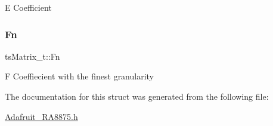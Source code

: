 E Coefficient \mbox{\label{structts_matrix__t_a1149b82092ab4feb4b71c08f0ac092a5}} 
\subsubsection{\texorpdfstring{Fn}{Fn}}
{\footnotesize\ttfamily ts\+Matrix\+\_\+t\+::\+Fn}

F Coeffiecient with the finest granularity 

The documentation for this struct was generated from the following file\+:\begin{DoxyCompactItemize}
\item 
\mbox{\hyperlink{_adafruit___r_a8875_8h}{Adafruit\+\_\+\+R\+A8875.\+h}}\end{DoxyCompactItemize}
